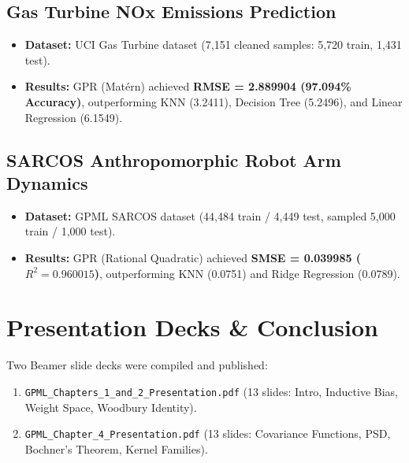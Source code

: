 \documentclass[11pt,a4paper]{article}
\begin{document}
\subsection{Gas Turbine NOx Emissions Prediction}
\begin{itemize}
  \item \textbf{Dataset:} UCI Gas Turbine dataset (7,151 cleaned samples: 5,720 train, 1,431 test).
  \item \textbf{Results:} GPR (Matérn) achieved \textbf{RMSE = 2.889904 (97.094\% Accuracy)}, outperforming KNN (3.2411), Decision Tree (5.2496), and Linear Regression (6.1549).
\end{itemize}

\subsection{SARCOS Anthropomorphic Robot Arm Dynamics}
\begin{itemize}
  \item \textbf{Dataset:} GPML SARCOS dataset (44,484 train / 4,449 test, sampled 5,000 train / 1,000 test).
  \item \textbf{Results:} GPR (Rational Quadratic) achieved \textbf{SMSE = 0.039985 ($R^2 = 0.960015$)}, outperforming KNN (0.0751) and Ridge Regression (0.0789).
\end{itemize}

\section{Presentation Decks \& Conclusion}
Two Beamer slide decks were compiled and published:
\begin{enumerate}
  \item \texttt{GPML\_Chapters\_1\_and\_2\_Presentation.pdf} (13 slides: Intro, Inductive Bias, Weight Space, Woodbury Identity).
  \item \texttt{GPML\_Chapter\_4\_Presentation.pdf} (13 slides: Covariance Functions, PSD, Bochner's Theorem, Kernel Families).
\end{enumerate}
\end{document}
